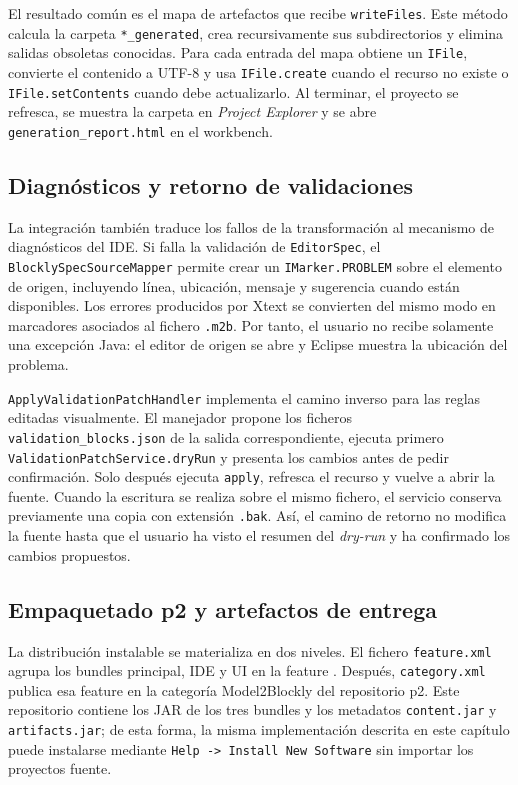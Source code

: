 El resultado común es el mapa de artefactos que recibe \texttt{writeFiles}.
Este método calcula la carpeta \texttt{*\_generated}, crea recursivamente sus
subdirectorios y elimina salidas obsoletas conocidas. Para cada entrada del
mapa obtiene un \texttt{IFile}, convierte el contenido a UTF-8 y usa
\texttt{IFile.create} cuando el recurso no existe o
\texttt{IFile.setContents} cuando debe actualizarlo. Al terminar, el proyecto
se refresca, se muestra la carpeta en \emph{Project Explorer} y se abre
\texttt{generation\_report.html} en el workbench.

\subsection{Diagnósticos y retorno de validaciones}

La integración también traduce los fallos de la transformación al mecanismo de
diagnósticos del IDE. Si falla la validación de \texttt{EditorSpec}, el
\texttt{BlocklySpecSourceMapper} permite crear un \texttt{IMarker.PROBLEM} sobre
el elemento de origen, incluyendo línea, ubicación, mensaje y sugerencia cuando
están disponibles. Los errores producidos por Xtext se convierten del mismo modo
en marcadores asociados al fichero \texttt{.m2b}. Por tanto, el usuario no recibe
solamente una excepción Java: el editor de origen se abre y Eclipse muestra la
ubicación del problema.

\texttt{ApplyValidationPatchHandler} implementa el camino inverso para las
reglas editadas visualmente. El manejador propone los ficheros
\texttt{validation\_blocks.json} de la salida correspondiente, ejecuta primero
\texttt{ValidationPatchService.dryRun} y presenta los cambios antes de pedir
confirmación. Solo después ejecuta \texttt{apply}, refresca el recurso y vuelve
a abrir la fuente. Cuando la escritura se realiza sobre el mismo fichero, el
servicio conserva previamente una copia con extensión \texttt{.bak}. Así, el
camino de retorno no modifica la fuente hasta que el usuario ha visto el
resumen del \emph{dry-run} y ha confirmado los cambios propuestos.

\subsection{Empaquetado p2 y artefactos de entrega}

La distribución instalable se materializa en dos niveles. El fichero
\texttt{feature.xml} agrupa los bundles principal, IDE y UI en la feature
. Después,
\texttt{category.xml} publica esa feature en la categoría Model2Blockly del
repositorio p2. Este repositorio contiene los JAR de los tres bundles y los
metadatos \texttt{content.jar} y \texttt{artifacts.jar}; de esta forma, la misma
implementación descrita en este capítulo puede instalarse mediante
\texttt{Help -> Install New Software} sin importar los proyectos fuente.

